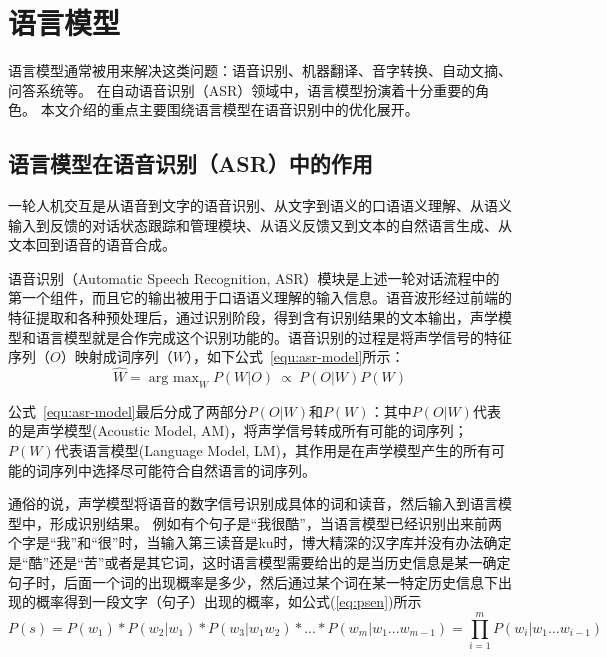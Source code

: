 
\chapter{语言模型}
\label{chap:lm}




语言模型通常被用来解决这类问题：语音识别、机器翻译、音字转换、自动文摘、问答系统等。
在自动语音识别（ASR）领域中，语言模型扮演着十分重要的角色。
本文介绍的重点主要围绕语言模型在语音识别中的优化展开。


\section{语言模型在语音识别（ASR）中的作用} 
一轮人机交互是从语音到文字的语音识别、从文字到语义的口语语义理解、从语义输入到反馈的对话状态跟踪和管理模块、从语义反馈又到文本的自然语言生成、从文本回到语音的语音合成。


语音识别（Automatic Speech Recognition, ASR）模块是上述一轮对话流程中的第一个组件，而且它的输出被用于口语语义理解的输入信息。语音波形经过前端的特征提取和各种预处理后，通过识别阶段，得到含有识别结果的文本输出，声学模型和语言模型就是合作完成这个识别功能的。语音识别的过程是将声学信号的特征序列（$O$）映射成词序列（$W$），如下公式~\ref{equ:asr-model}所示：
\begin{equation}
\hat{W} = \mathop{\text{arg max}}_{W}P(W|O) \ \varpropto\ P(O|W)P(W)
\label{equ:asr-model}
\end{equation}

公式~\ref{equ:asr-model}最后分成了两部分$P(O|W)$和$P(W)$：其中$P(O|W)$代表的是声学模型(Acoustic Model, AM)，将声学信号转成所有可能的词序列；$P(W)$代表语言模型(Language Model, LM)，其作用是在声学模型产生的所有可能的词序列中选择尽可能符合自然语言的词序列。


通俗的说，声学模型将语音的数字信号识别成具体的词和读音，然后输入到语言模型中，形成识别结果。
例如有个句子是“我很酷”，当语言模型已经识别出来前两个字是“我”和“很”时，当输入第三读音是ku时，博大精深的汉字库并没有办法确定是“酷”还是“苦”或者是其它词，这时语言模型需要给出的是当历史信息是某一确定句子时，后面一个词的出现概率是多少，然后通过某个词在某一特定历史信息下出现的概率得到一段文字（句子）出现的概率，如公式(\ref{eq:psen})所示
\begin{equation}
	\label{eq:psen}
   	P(s) = P({w_1})*P({w_2}|{w_1})*P({w_3}|{w_1}{w_2})*...*P({w_m}|{w_1}...{w_{m - 1}}) = \prod\limits_{i = 1}^m {P({w_i}|{w_1}...{w_{i - 1}})} 
\end{equation}

